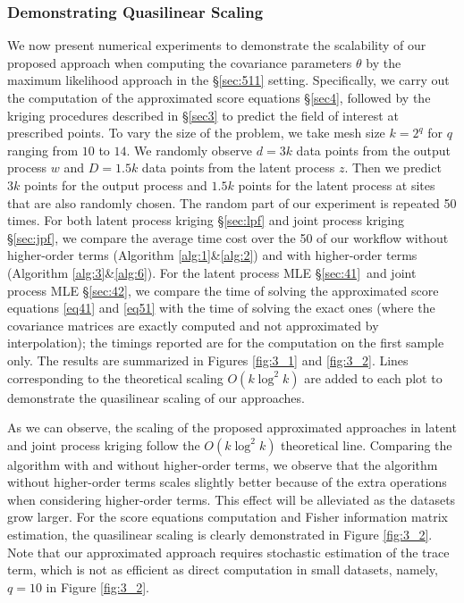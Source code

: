 \documentclass[article,ij4uq]{ij4uq}              %
\begin{document}
\subsubsection{Demonstrating Quasilinear Scaling}\label{ss:quasilinear}
 We now present numerical experiments to demonstrate the scalability of our proposed approach when computing the covariance parameters $\theta$ by the maximum likelihood approach in the \S \ref{sec:511} setting. Specifically, we carry out the computation of the approximated score equations \S \ref{sec4}, followed by the kriging procedures described in \S \ref{sec3} to predict the field of interest at prescribed points. To vary the size of the problem, we take mesh size $k=2^{q}$ for $q$ ranging from $10$ to $14$. We randomly observe $d=3k$ data points from the output process $w$ and $D=1.5k$ data points from the latent process $z$. Then we predict $3k$ points for the output process and $1.5k$ points for the latent process at sites that are also randomly chosen. The random part of our experiment is repeated 50 times. For both latent process kriging \S \ref{sec:lpf} and joint process kriging \S \ref{sec:jpf}, we compare the average time cost over the 50 of our workflow without higher-order terms (Algorithm \ref{alg:1}\&\ref{alg:2}) and with higher-order terms (Algorithm \ref{alg:3}\&\ref{alg:6}). For the latent process MLE \S \ref{sec:41}\ and joint process MLE \S \ref{sec:42}, we compare the time of solving the approximated score equations \eqref{eq41} and \eqref{eq51} with the time of solving the exact ones (where the covariance matrices are exactly computed and not approximated by interpolation); the timings reported are for  the computation on the first sample only. The results are summarized in Figures \ref{fig:3_1} and \ref{fig:3_2}. Lines corresponding to the theoretical scaling $O(k\log^{2}{k})$ are added to each plot to demonstrate the quasilinear scaling of our approaches.

 As we can observe, the scaling of the proposed approximated approaches in latent and joint process kriging follow the $O(k\log^{2}{k})$ theoretical line. Comparing the algorithm with and without higher-order terms, we observe that the algorithm without higher-order terms scales slightly better because of the extra operations when considering higher-order terms. This effect will be alleviated as the datasets grow larger. For the score equations computation and Fisher information matrix estimation, the quasilinear scaling is clearly demonstrated in Figure \ref{fig:3_2}. Note that our approximated approach requires stochastic estimation of the trace term, which is not as efficient as direct computation in small datasets, namely, $q=10$ in Figure \ref{fig:3_2}.
 
\end{document}
